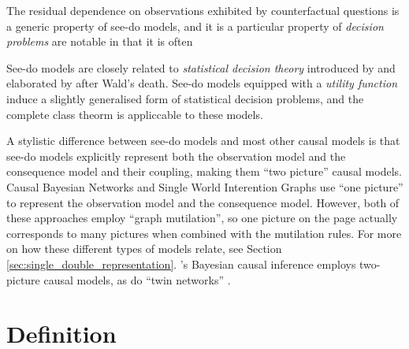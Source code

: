 

The residual dependence on observations exhibited by counterfactual questions is a generic property of see-do models, and it is a particular property of \emph{decision problems} are notable in that it is often


See-do models are closely related to \emph{statistical decision theory} introduced by \citet{wald_statistical_1950} and elaborated by \citet{savage_foundations_1972} after Wald's death. See-do models equipped with a \emph{utility function} induce a slightly generalised form of statistical decision problems, and the complete class theorm is appliccable to these models.

A stylistic difference between see-do models and most other causal models is that see-do models explicitly represent both the observation model and the consequence model and their coupling, making them ``two picture'' causal models. Causal Bayesian Networks and Single World Interention Graphs \citep{richardson2013single} use ``one picture'' to represent the observation model and the consequence model. However, both of these approaches employ ``graph mutilation'', so one picture on the page actually corresponds to many pictures when combined with the mutilation rules. For more on how these different types of models relate, see Section \ref{sec:single_double_representation}. \citet{lattimore_replacing_2019}'s Bayesian causal inference employs two-picture causal models, as do ``twin networks'' \citep{pearl_causality:_2009}.


\section{Definition}


